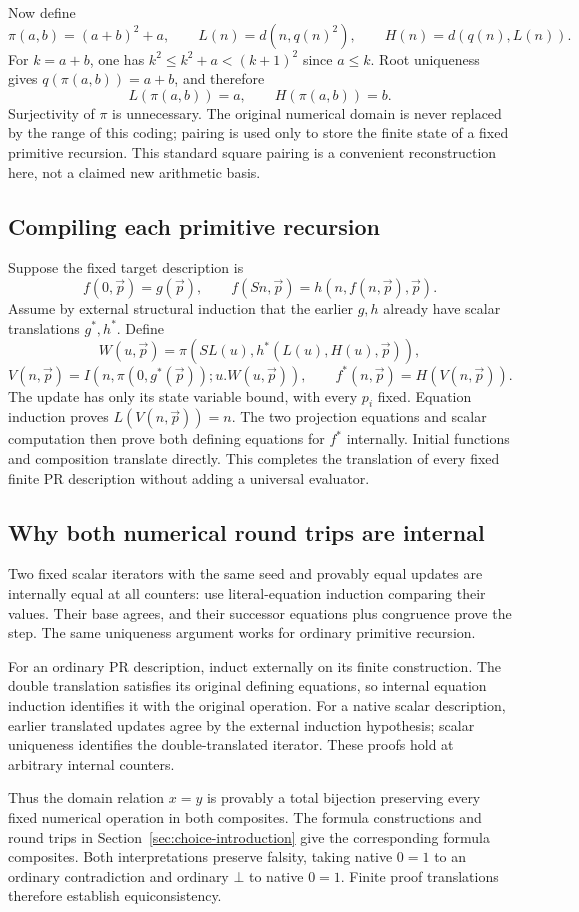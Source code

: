 Now define
\[
 \pi(a,b)=(a+b)^2+a,\qquad
 L(n)=d(n,q(n)^2),\qquad H(n)=d(q(n),L(n)).
\]
For $k=a+b$, one has $k^2\le k^2+a<(k+1)^2$ since $a\le k$.
Root uniqueness gives $q(\pi(a,b))=a+b$, and therefore
\[
                    L(\pi(a,b))=a,\qquad H(\pi(a,b))=b.
\]
Surjectivity of $\pi$ is unnecessary. The original numerical domain
is never replaced by the range of this coding; pairing is used only
to store the finite state of a fixed primitive recursion. This
standard square pairing is a convenient reconstruction here, not
a claimed new arithmetic basis.

\subsection{Compiling each primitive recursion}

Suppose the fixed target description is
\[
 f(0,\vec p)=g(\vec p),\qquad
 f(Sn,\vec p)=h(n,f(n,\vec p),\vec p).
\]
Assume by external structural induction that the earlier $g,h$
already have scalar translations $g^*,h^*$. Define
\[
 W(u,\vec p)=\pi(SL(u),h^*(L(u),H(u),\vec p)),
\]
\[
 V(n,\vec p)=I(n,\pi(0,g^*(\vec p));u.W(u,\vec p)),
 \qquad f^*(n,\vec p)=H(V(n,\vec p)).
\]
The update has only its state variable bound, with every $p_i$
fixed. Equation induction proves $L(V(n,\vec p))=n$.
The two projection equations and scalar computation then prove
both defining equations for $f^*$ internally. Initial functions
and composition translate directly. This completes the translation
of every fixed finite PR description without adding a universal
evaluator.

\subsection{Why both numerical round trips are internal}

Two fixed scalar iterators with the same seed and provably equal
updates are internally equal at all counters: use literal-equation
induction comparing their values. Their base agrees, and their
successor equations plus congruence prove the step. The same
uniqueness argument works for ordinary primitive recursion.

For an ordinary PR description, induct externally on its finite
construction. The double translation satisfies its original
defining equations, so internal equation induction identifies it
with the original operation. For a native scalar description,
earlier translated updates agree by the external induction
hypothesis; scalar uniqueness identifies the double-translated
iterator. These proofs hold at arbitrary internal counters.

Thus the domain relation $x=y$ is provably a total bijection
preserving every fixed numerical operation in both composites.
The formula constructions and round trips in
Section~\ref{sec:choice-introduction} give the corresponding formula
composites. Both interpretations preserve falsity, taking native
$0=1$ to an ordinary contradiction and ordinary $\bot$ to native
$0=1$. Finite proof translations therefore establish equiconsistency.
